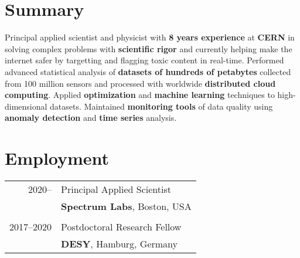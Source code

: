 \documentclass[a4paper,10pt]{article}
\begin{document}
\section{Summary}
Principal applied scientist and physicist with {\bf 8 years experience} at {\bf CERN} in solving complex problems with {\bf scientific rigor} and currently helping make the internet safer by targetting and flagging toxic content in real-time. Performed advanced statistical analysis of {\bf datasets of hundreds of petabytes} collected from 100 million sensors and processed with worldwide {\bf distributed cloud computing}. Applied {\bf optimization} and {\bf machine learning} techniques to high-dimensional datasets. Maintained {\bf monitoring tools} of data quality using {\bf anomaly detection} and {\bf time series} analysis.


\vspace{3mm}
\section{Employment}
\begin{tabular}{r|p{15.5cm}}
\textsc{2020--}   & Principal Applied Scientist  \\
              &   {\bf Spectrum Labs}, Boston, USA              \\
\multicolumn{2}{c}{} \\
\textsc{2017--2020}		&	Postdoctoral Research Fellow 	\\
							&		{\bf DESY}, Hamburg, Germany  						\\
\end{tabular}
\end{document}
